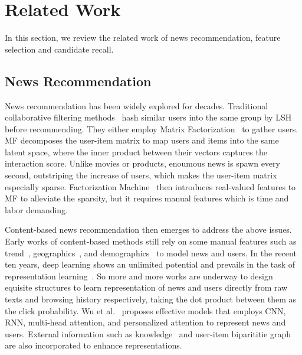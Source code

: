 \documentclass[sigconf,anonymous]{acmart}
\begin{document}
\section{Related Work}
\label{section:related work}
In this section, we review the related work of news recommendation, feature selection and candidate recall.
\subsection{News Recommendation}
News recommendation has been widely explored for decades. Traditional collaborative filtering methods~\cite{das_CF, li_SCENE} hash similar users into the same group by LSH before recommending. They either employ Matrix Factorization~\cite{koren_MF} to gather users. MF decomposes the user-item matrix to map users and items into the same latent space, where the inner product between their vectors captures the interaction score. Unlike movies or products, enoumous news is spawn every second, outstriping the increase of users, which makes the user-item matrix especially sparse. Factorization Machine~\cite{rendle_FM} then introduces real-valued features to MF to alleviate the sparsity, but it requires manual features which is time and labor demanding.

Content-based news recommendation then emerges to address the above issues. Early works of content-based methods still rely on some manual features such as trend~\cite{liu_bayesian_news_trend}, geographics~\cite{li_contextual_bandit}, and demographics~\cite{cheng_Wide&Deep} to model news and users. In the recent ten years, deep learning shows an unlimited potential and prevails in the task of representation learning~\cite{Bengio_representation_learning}. So more and more works are underway to design equisite structures to learn representation of news and users directly from raw texts and browsing history respectively, taking the dot product between them as the click probability. Wu et al.~\cite{wu_GNN,wu_heterogeneous,wu_LSTUR,wu_NAML,wu_NPA,wu_NRMS,wu_topic-aware} proposes effective models that employs CNN, RNN, multi-head attention, and personalized attention to represent news and users. External information such as knowledge~\cite{wang_DKN} and user-item biparititie graph~\cite{wu_GNN,hu_GNN_disentanglement} are also incorporated to enhance representations.
\end{document}
